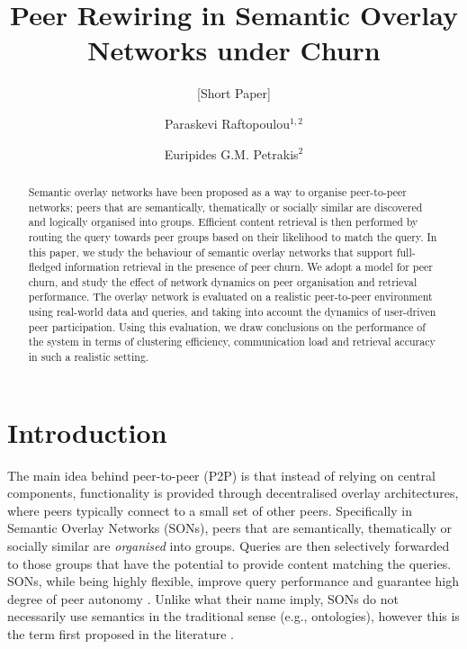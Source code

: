 \documentclass{llncs}
\begin{document}
\title{Peer Rewiring in Semantic Overlay Networks under Churn}
\subtitle{[Short Paper]}

\author{Paraskevi Raftopoulou$^{1,2}$ \and Euripides G.M. Petrakis$^2$\\}
%



\maketitle

\begin{abstract}
Semantic overlay networks have been proposed as a way to organise peer-to-peer networks; peers that are semantically, thematically or socially similar are discovered and logically organised into groups. Efficient content retrieval is then performed by routing the query towards peer groups based on their likelihood to match the query. In this paper, we study the behaviour of semantic overlay networks that support full-fledged information retrieval in the presence of peer churn. We adopt a model for peer churn, and study the effect of network dynamics on peer organisation and retrieval performance. The overlay network is evaluated on a realistic peer-to-peer environment using real-world data and queries, and taking into account the dynamics of user-driven peer participation. Using this evaluation, we draw conclusions on the performance of the system in terms of clustering efficiency, communication load and retrieval accuracy in such a realistic setting.
\end{abstract}


\section{Introduction} \label{sec:introduction}
The main idea behind peer-to-peer (P2P) is that instead of relying on central components, functionality is provided through decentralised overlay architectures, where peers typically connect to a small set of other peers. Specifically in Semantic Overlay Networks (SONs), peers that are semantically, thematically or socially similar are \emph{organised} into groups. Queries are then selectively forwarded to those groups that have the potential to provide content matching the queries. SONs, while being highly flexible, improve query performance and guarantee high degree of peer autonomy \cite{molina02efficient}. Unlike what their name imply, SONs do not necessarily use semantics in the traditional sense (e.g., ontologies), however this is the term first proposed in the literature \cite{crespo02routing}.
\end{document}
